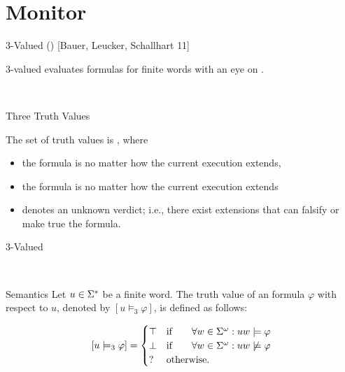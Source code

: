 
\section{\LTLtri Monitor}
\begin{frame}{3-Valued \LTL (\LTLtri) [Bauer, Leucker, Schallhart 11] }

3-valued \LTL evaluates \LTL formulas for finite words with an 
eye on .

\ \\


\begin{block}{Three Truth Values}
 
The set of truth values is , where

\begin{itemize}


 \item \Def{$\top$:} the formula is  no matter 
how the current execution extends,


\item \Def{$\bot$:} the formula is  no matter 
how the current execution extends


\item {} denotes an unknown verdict; i.e., there exist extensions that can 
falsify or make true the formula.
\end{itemize}

\end{block}

\end{frame}




\begin{frame}{3-Valued \LTL}

\ \\

\begin{block}{\LTLtri Semantics}
Let $u \in \Sigma^{*}$ be a finite word. The truth value of an \LTLtri 
formula $\varphi$ with respect to $u$, denoted by $[u \models_3 \varphi]$, is 
defined as follows:

 \begin{equation*}
 	\left[ u \models_3 \varphi \right] = 
 		\begin{cases} \top & \text{if }~~~~~\forall w \in 
\Sigma^\omega : 
uw \models \varphi\\
 		\bot & \text{if }~~~~~\forall w \in \Sigma^\omega : uw \not 
\models \varphi\\
 		? & \text{otherwise}.
 	\end{cases}
 \end{equation*}
 
\end{block}

\end{frame}

